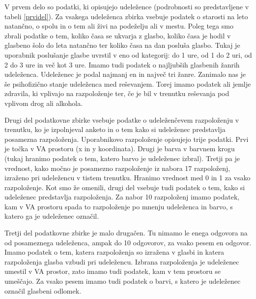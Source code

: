 \documentclass[a4paper, 12pt]{book}
\begin{document}
{V prvem delo so podatki, ki opisujejo udeležence (podrobnosti so predstavljene v tabeli \ref{prvidel}). Za vsakega udeleženca zbirka vsebuje podatek o starosti na leto natančno, o spolu in o tem ali živi na podeželju ali v mestu. Poleg tega smo zbrali podatke o tem, koliko časa se ukvarja z glasbo, koliko časa je hodil v glasbeno šolo do leta natančno ter koliko časa na dan posluša glasbo. Tukaj je uporabnik poslušanje glasbe uvrstil v eno od kategorij: do 1 ure, od 1 do 2 uri, od 2 do 3 ure in več kot 3 ure. Imamo tudi podatek o najljubših glasbenih žanrih udeleženca. Udeleženec je podal najmanj en in največ tri žanre. Zanimalo nas je še psihofizično stanje udeleženca med reševanjem. Torej imamo podatek ali jemlje zdravila, ki vplivajo na razpoloženje ter, če je bil v trenutku reševanja pod vplivom drog ali alkohola. 

Drugi del podatkovne zbirke vsebuje podatke o udeleženčevem razpoloženju v trenutku, ko je izpolnjeval anketo in o tem kako si udeleženec predstavlja posamezna razpoloženja. Uporabnikovo razpoloženje opisujejo trije podatki. Prvi je točka v VA prostoru (x in y koordinata). Drugi je barva v barvnem krogu (tukaj hranimo podatek o tem, katero barvo je  udeleženec izbral). Tretji pa je vrednost, kako močno je posamezno razpoloženje iz nabora 17 razpoloženj, izraženo pri udeležencu v tistem trenutku. Hranimo vrednost med 0 in 1 za vsako razpoloženje. Kot smo že omenili, drugi del vsebuje tudi podatek o tem, kako si udeleženec predstavlja razpoloženja. Za nabor 10 razpoloženj imamo podatek, kam v VA prostoru spada to razpoloženje po mnenju udeleženca in barvo, s katero ga je udeleženec označil. 

Tretji del podatkovne zbirke je malo drugačen. Tu nimamo le enega odgovora na od posameznega udeleženca, ampak do 10 odgovorov, za vsako pesem en odgovor. Imamo podatek o tem, katera razpoloženja so izražena v glasbi in katera razpoloženja glasba vzbudi pri udeležencu. Izbrana razpoloženja je udeleženec umestil v VA prostor, zato imamo tudi podatek, kam v tem prostoru se umeščajo.  Za vsako pesem imamo tudi podatek o barvi, s katero je udeleženec označil glasbeni odlomek.  

\newpage

}
\end{document}
